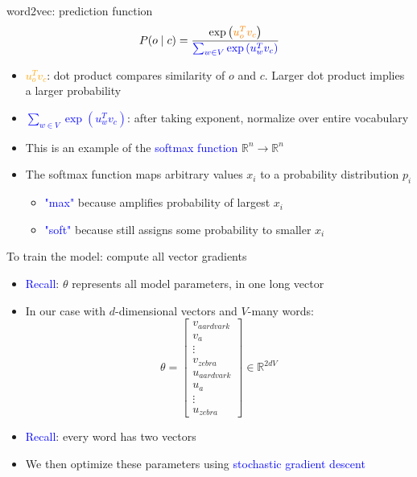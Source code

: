 \documentclass[usenames,dvipsnames,english]{beamer}
\begin{document}
\begin{frame}{word2vec: prediction function}
        $$
        P(o \mid c)=\frac{\exp \left(\textcolor{orange}{u_{o}^{T} v_{c}}\right)}{\textcolor{blue}{\sum_{w \in V} \exp \left(u_{w}^{T} v_{c}\right)}}
        $$
    \begin{itemize}
        \setlength{\itemsep}{1em}

        \item \textcolor{orange}{$u_{o}^{T} v_{c}$}: dot product compares similarity of $o$ and $c$. Larger dot product implies a larger probability
        \item \textcolor{blue}{$\sum_{w \in V} \exp \left(u_{w}^{T} v_{c}\right)$}: after taking exponent, normalize over entire vocabulary

        \item This is an example of the \textcolor{blue}{softmax function} $\mathbb{R}^n \rightarrow \mathbb{R}^n$
        \item The softmax function maps arbitrary values $x_i$ to a probability distribution $p_i$
        \begin{itemize}
            \setlength{\itemsep}{0.8em}
            \vspace{5pt}
            \item \textcolor{blue}{"max"} because amplifies probability of largest $x_i$
            \item \textcolor{blue}{"soft"} because still assigns some probability to smaller $x_i$
        \end{itemize}
    \end{itemize}
\end{frame}
\begin{frame}{To train the model: compute all vector gradients}

    \begin{itemize}
        \setlength{\itemsep}{1em}
        
        \item \textcolor{blue}{Recall}: $\theta$ represents all model parameters, in one long vector
        \item In our case with $d$-dimensional vectors and $V$-many words:
        $$
        \theta=\left[\begin{array}{l}
        v_{aardvark} \\
        v_{a} \\
        \vdots \\
        v_{zebra} \\
        u_{aardvark} \\
        u_{a} \\
        \vdots \\
        u_{zebra}
        \end{array}\right] \in \mathbb{R}^{2 d V}
        $$
        \item \textcolor{blue}{Recall}: every word has two vectors
        \item We then optimize these parameters using \textcolor{blue}{stochastic gradient descent}
    \end{itemize}
    
\end{frame}
\end{document}

